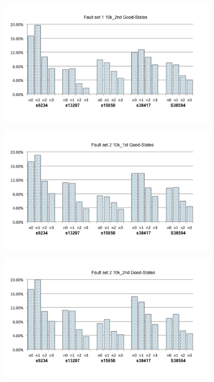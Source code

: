 \documentclass[10 pt, technote]{IEEEtran}
\begin{document}
\begin{figure}[H]
\includegraphics[scale=0.2,width = \linewidth]{../Figures/percentage_increase_set1_10k_2nd.jpg}
\end{figure}

\begin{figure}[H]
\includegraphics[scale=0.2,width = \linewidth]{../Figures/percentage_increase_set2_10k_1st.jpg}
\end{figure}

\begin{figure}[H]
\includegraphics[scale=0.2,width = \linewidth]{../Figures/percentage_increase_set2_10k_2nd.jpg}
\end{figure}
\end{document}
